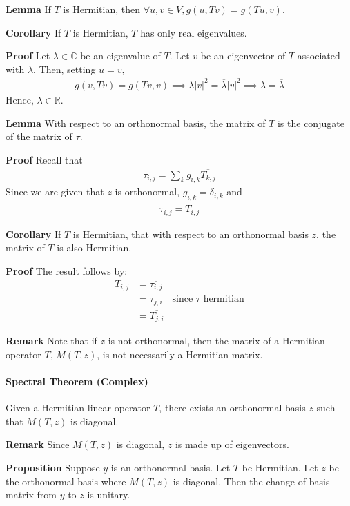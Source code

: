 \documentclass{article}
\begin{document}
\textbf{Lemma} If $T$ is Hermitian, then $\forall u,v \in V, g(u,Tv)=g(Tu,v)$.

\textbf{Corollary} If $T$ is Hermitian, $T$ has only real eigenvalues.

\textbf{Proof} Let $\lambda \in \mathbb{C}$ be an eigenvalue of $T$. Let $v$ be an eigenvector of $T$ associated with $\lambda$. Then, setting $u=v$,
\begin{align*}
	g(v,Tv) = g(Tv,v) \implies \lambda |v|^2=\overline{\lambda} |v|^2 \implies \lambda=\overline{\lambda}
\end{align*}
Hence, $\lambda \in \mathbb{R}$.

\textbf{Lemma} With respect to an orthonormal basis, the matrix of $T$ is the conjugate of the matrix of $\tau$.

\textbf{Proof} Recall that 
\begin{align*}
	\tau_{i,j} = \sum_k g_{i,k}\overline{T_{k,j}}
\end{align*}
Since we are given that $z$ is orthonormal, $g_{i,k}=\delta_{i,k}$ and 
\begin{align*}
	\tau_{i,j} = \overline{T_{i,j}}
\end{align*}

\textbf{Corollary} If $T$ is Hermitian, that with respect to an orthonormal basis $z$, the matrix of $T$ is also Hermitian.

\textbf{Proof} The result follows by:
\begin{align*}
	T_{i,j} &= \overline{\tau_{i,j}} \\
	&= \tau_{j,i}\quad \text{since }\tau \text{ hermitian}\\
	&= \overline{T_{j,i}}
\end{align*}

\textbf{Remark} Note that if $z$ is not orthonormal, then the matrix of a Hermitian operator $T$, $M(T,z)$, is not necessarily a Hermitian matrix.

\paragraph{Spectral Theorem (Complex)} Given a Hermitian linear operator $T$, there exists an orthonormal basis $z$ such that $M(T,z)$ is diagonal.

\textbf{Remark} Since $M(T,z)$ is diagonal, $z$ is made up of eigenvectors.

\textbf{Proposition} Suppose $y$ is an orthonormal basis. Let $T$ be Hermitian. Let $z$ be the orthonormal basis where $M(T,z)$ is diagonal. Then the change of basis matrix from $y$ to $z$ is unitary.
\end{document}
